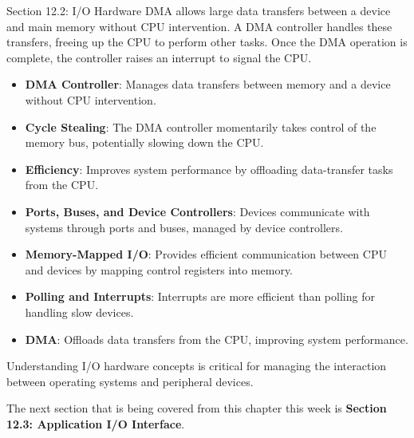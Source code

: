 \begin{notes}{Section 12.2: I/O Hardware}
    DMA allows large data transfers between a device and main memory without CPU intervention. A DMA controller handles these transfers, freeing up the CPU to perform other tasks. Once the DMA operation 
    is complete, the controller raises an interrupt to signal the CPU.
    
    \begin{highlight}
    
        \begin{itemize}
            \item \textbf{DMA Controller}: Manages data transfers between memory and a device without CPU intervention.
            \item \textbf{Cycle Stealing}: The DMA controller momentarily takes control of the memory bus, potentially slowing down the CPU.
            \item \textbf{Efficiency}: Improves system performance by offloading data-transfer tasks from the CPU.
        \end{itemize}
    
    \end{highlight}
    
    \begin{highlight}
    
        \begin{itemize}
            \item \textbf{Ports, Buses, and Device Controllers}: Devices communicate with systems through ports and buses, managed by device controllers.
            \item \textbf{Memory-Mapped I/O}: Provides efficient communication between CPU and devices by mapping control registers into memory.
            \item \textbf{Polling and Interrupts}: Interrupts are more efficient than polling for handling slow devices.
            \item \textbf{DMA}: Offloads data transfers from the CPU, improving system performance.
        \end{itemize}
    
    Understanding I/O hardware concepts is critical for managing the interaction between operating systems and peripheral devices.
    
    \end{highlight}
\end{notes}

The next section that is being covered from this chapter this week is \textbf{Section 12.3: Application I/O Interface}.

